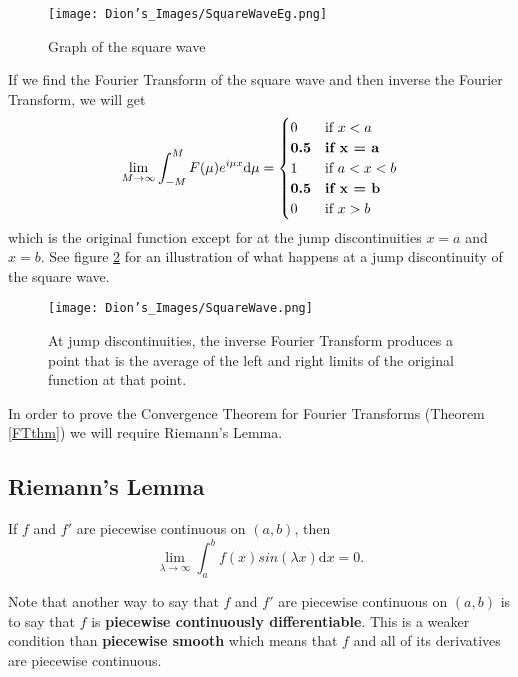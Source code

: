\begin{figure}[h]
\centering
\texttt{[image: Dion's\_Images/SquareWaveEg.png]}
\caption{Graph of the square wave}
\label{SquareWaveEg}
\end{figure}

If we find the Fourier Transform of the square wave and then inverse the Fourier Transform, we will get
$$\lim_{M\rightarrow\infty}\int_{-M}^{M} F(\mu)e^{i\mu x}\mathrm{d}\mu = \begin{cases}
      \displaystyle 0 & \mbox{if }x < a \\
      \textbf{0.5} & \textbf{\mbox{if }x = a} \\
      1 & \mbox{if }a < x < b \\
      \textbf{0.5} & \textbf{\mbox{if }x = b} \\
      0 & \mbox{if }x > b
   \end{cases}$$
   which is the original function except for at the jump discontinuities $x = a$ and $x = b$.
   See figure \ref{SquareWaveLimit} for an illustration of what happens at a jump discontinuity of the square wave.

\begin{figure}[h]
\centering
\texttt{[image: Dion's\_Images/SquareWave.png]}
\caption{At jump discontinuities, the inverse Fourier Transform produces a point that is the average of the left and right limits of the original function at that point.}
\label{SquareWaveLimit}
\end{figure}

In order to prove the Convergence Theorem for Fourier Transforms (Theorem \ref{FTthm}) we will require Riemann's Lemma.

\subsection{Riemann's Lemma} \label{subsec:Riemann'sL}

\begin{lem} \label{Riemann'sL}
If $f$ and $f'$ are piecewise continuous on $(a,b)$, then
$$ \lim_{\lambda\rightarrow\infty}\int_a^b f(x)sin(\lambda x) \mathrm{d}x = 0.$$
\end{lem}

Note that another way to say that $f$ and $f'$ are piecewise continuous on $(a,b)$ is to say that $f$ is \textbf{piecewise continuously differentiable}.
This is a weaker condition than \textbf{piecewise smooth} which means that $f$ and all of its derivatives are piecewise continuous.

